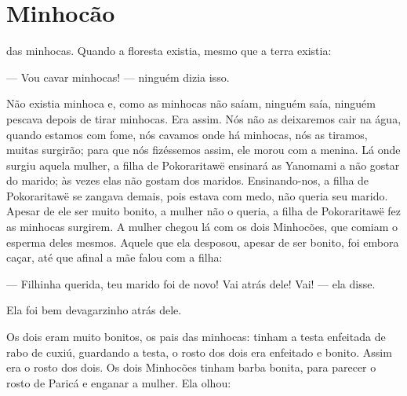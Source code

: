 \chapter{Minhocão}
 
 das minhocas. Quando a floresta existia, mesmo que a terra
existia: 

--- Vou cavar minhocas! --- ninguém dizia isso. 

Não existia minhoca e, como as minhocas não saíam, ninguém saía, ninguém
pescava depois de tirar minhocas. Era assim. Nós não as deixaremos cair
na água, quando estamos com fome, nós cavamos onde há minhocas, nós as
tiramos, muitas surgirão; para que nós fizéssemos assim, ele morou com a
menina. Lá onde surgiu aquela mulher, a filha de Pokoraritawë ensinará
as Yanomami a não gostar do marido;  às vezes elas não gostam dos maridos. Ensinando-nos, a filha de Pokoraritawë se zangava demais, pois
estava com medo, não queria seu marido. Apesar de ele ser muito bonito,
a mulher não o queria, a filha de Pokoraritawë fez as minhocas surgirem.
A mulher chegou lá com os dois Minhocões, que comiam o esperma deles
mesmos. Aquele que ela desposou, apesar de ser bonito, foi embora caçar,
até que afinal a mãe falou com a filha: 

--- Filhinha querida, teu marido foi de novo! Vai atrás dele! Vai! ---
ela disse. 

Ela foi bem devagarzinho atrás dele. 



Os dois eram muito bonitos, os pais das minhocas: tinham a testa
enfeitada de rabo de cuxiú, guardando a testa, o rosto dos dois era
enfeitado e bonito. Assim era o rosto dos dois. Os dois Minhocões tinham
barba bonita, para parecer o rosto de Paricá e enganar a mulher. Ela
olhou:

